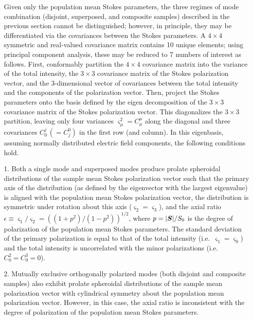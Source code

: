 \documentclass[twocolumn]{aastex6}
\newcommand{\mbf}[1]{\mbox{\boldmath $#1$}}
\newcommand{\irow}{\mu} \newcommand{\icol}{\nu}
\newcommand{\srow}{j} \newcommand{\scol}{k}
\begin{document}
Given only the population mean Stokes parameters, the three regimes of
mode combination (disjoint, superposed, and composite samples)
described in the previous section cannot be distinguished;
%
however, in principle, they may be differentiated via the covariances
between the Stokes parameters.
%
A $4\times4$ symmetric and real-valued covariance matrix contains 10
unique elements; using principal component analysis, these may be
reduced to 7 numbers of interest as follows.
%
First, conformably partition the $4\times4$ covariance matrix into 
the variance of the total intensity,
the $3\times3$ covariance matrix of the Stokes polarization vector, and
the 3-dimensional vector of covariances between the total intensity and the
components of the polarization vector.
%
Then, project the Stokes parameters onto the basis defined by the
eigen decomposition of the $3\times3$ covariance matrix of the Stokes
polarization vector.
%
This diagonalizes the $3\times3$ partition, leaving only four
variances $\varsigma_\irow^2=C_\irow^\irow$ along the diagonal and three covariances
$C_0^\srow\,(=C_\srow^0)$ in the first row (and column).
%
In this eigenbasis, assuming normally distributed electric field
components, the following conditions hold.

1. Both a single mode and superposed modes produce prolate spheroidal
distributions of the sample mean Stokes polarization vector such that
the primary axis of the distribution (as defined by the eigenvector
with the largest eigenvalue) is aligned with the population mean
Stokes polarization vector, the distribution is symmetric under
rotation about this axis ($\varsigma_2=\varsigma_3$), and the axial
ratio
$\epsilon\equiv\varsigma_1/\varsigma_{2}=((1+p^2)/(1-p^2))^{1/2}$,
where $p=|\mbf{S}|/S_0$ is the degree of polarization of the
population mean Stokes parameters.
%
The standard deviation of the primary polarization is
equal to that of the total intensity (i.e.\ $\varsigma_1=\varsigma_0$) and
the total intensity is uncorrelated with the minor polarizations
(i.e.\ $C_0^2=C_0^3=0$).

2. Mutually exclusive orthogonally polarized modes (both disjoint and
composite samples) also exhibit prolate spheroidal distributions of the sample
mean polarization vector with cylindrical symmetry about the
population mean polarization vector.  However, in this case, the axial
ratio is inconsistent with the degree of polarization of the
population mean Stokes parameters.
\end{document}
